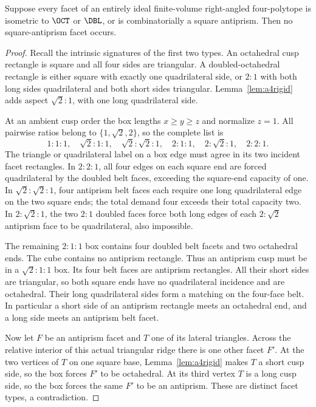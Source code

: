 \begin{theorem}\label{thm:a4exclude}
Suppose every facet of an entirely ideal finite-volume right-angled
four-polytope is isometric to \(\OCT\) or \(\DBL\), or is
combinatorially a square antiprism. Then no square-antiprism facet
occurs.
\end{theorem}
\begin{proof}
Recall the intrinsic signatures of the first two types. An
octahedral cusp rectangle is square and all four sides are triangular.
A doubled-octahedral rectangle is either square with exactly one
quadrilateral side, or \(2:1\) with both long sides quadrilateral
and both short sides triangular. Lemma~\ref{lem:a4rigid} adds
aspect \(\sqrt2:1\), with one long quadrilateral side.

At an ambient cusp order the box lengths \(x\ge y\ge z\)
and normalize \(z=1\). All pairwise ratios belong to
\(\{1,\sqrt2,2\}\), so the complete list is
\[
 1:1:1,\quad \sqrt2:1:1,\quad\sqrt2:\sqrt2:1,\quad
 2:1:1,\quad2:\sqrt2:1,\quad2:2:1.
\]
The triangle or quadrilateral label on a box edge must agree in
its two incident facet rectangles. In \(2:2:1\), all four
edges on each square end are forced quadrilateral by the doubled
belt faces, exceeding the square-end capacity of one.
In \(\sqrt2:\sqrt2:1\), four antiprism belt faces each
require one long quadrilateral edge on the two square ends;
the total demand four exceeds their total capacity two.
In \(2:\sqrt2:1\), the two \(2:1\) doubled faces force
both long edges of each \(2:\sqrt2\) antiprism face to be
quadrilateral, also impossible.

The remaining \(2:1:1\) box contains four doubled belt facets
and two octahedral ends. The cube contains no antiprism rectangle.
Thus an antiprism cusp must be in a \(\sqrt2:1:1\) box.
Its four belt faces are antiprism rectangles. All their short sides
are triangular, so both square ends have no quadrilateral incidence
and are octahedral. Their long quadrilateral sides form a matching
on the four-face belt. In particular a short side of an antiprism
rectangle meets an octahedral end, and a long side meets an
antiprism belt facet.

Now let \(F\) be an antiprism facet and \(T\) one of its lateral
triangles. Across the relative interior of this actual triangular
ridge there is one other facet \(F'\). At the two vertices of
\(T\) on one square base, Lemma~\ref{lem:a4rigid} makes
\(T\) a short cusp side, so the box forces \(F'\) to be
octahedral. At its third vertex \(T\) is a long cusp side,
so the box forces the same \(F'\) to be an antiprism.
These are distinct facet types, a contradiction.
\end{proof}


